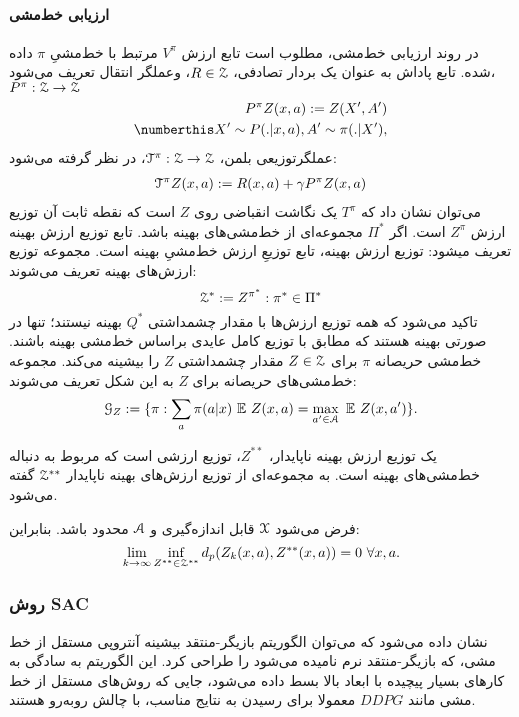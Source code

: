 \paragraph{ارزیابی خط‌مشی}
در روند ارزیابی خط‌مشی، مطلوب است تابع ارزش
$V^\pi$
مرتبط با خط‌مشیِ $\pi$ داده شده. 
تابع پاداش به عنوان یک بردار تصادفی، 
$R \in \EuScript{Z}$،
وعملگر انتقال تعریف می‌شود،
$P^\pi : \EuScript{Z} \rightarrow \EuScript{Z}$
\begin{align}
P^{\pi} Z(x,a) := Z(X',A') \\ \numberthis
X' \sim P(.|x,a), A'\sim \pi (.|X'), \nonumber
\end{align}
عملگرتوزیعی بلمن،
$\EuScript{T}^\pi : \EuScript{Z} \rightarrow \EuScript{Z}$،
 در نظر گرفته می‌شود:
\begin{align}
 \EuScript{T}^\pi Z(x,a) := R(x,a)+ \gamma P^\pi Z(x,a)
\end{align}  
می‌توان نشان داد که $T^\pi$ یک نگاشت انقباضی 
روی
 $Z$
  است که نقطه ثابت آن توزیع ارزش 
$Z^\pi$
    است.
اگر 
$\Pi^*$
مجموعه‌ای از خط‌مشی‌های بهینه باشد. 
تابع توزیع ارزش بهینه تعریف میشود:
توزیع ارزش بهینه، تابع توزیعِ ارزش خط‌مشیِ بهینه است. مجموعه توزیع ارزش‌های بهینه تعریف می‌شوند:
$$\EuScript{Z}^* := {Z^{\pi^{*}} : \pi^* \in \Pi^* }$$
تاکید می‌شود که همه توزیع ارزش‌ها با مقدار چشمداشتی $Q^*$ 
بهینه نیستند؛ تنها در صورتی بهینه هستند که مطابق با توزیع کامل عایدی بر‌اساس خط‌مشی بهینه باشند.
خط‌مشی حریصانه
$\pi$
برای
$Z \in \EuScript{Z}$
مقدار چشمداشتی
$Z$
 را بیشینه می‌کند.
 مجموعه خط‌مشی‌های حریصانه برای 
 $Z$
 به این شکل تعریف می‌شوند:
 $$\EuScript{G}_Z := \lbrace \pi : \sum_{a} \pi (a|x) \ \mathbb{E} \ Z(x,a) = \max_{a' \in \EuScript{A}} \ \mathbb{E} \ Z(x,a') \rbrace.$$

یک توزیع ارزش بهینه ناپایدار،
$Z^{**}$،
توزیع ارزشی‌ است که مربوط به دنباله خط‌مشی‌های بهینه است. به مجموعه‌ای از توزیع ارزش‌های بهینه ناپایدار 
 $\EuScript{Z}^{**}$
 گفته می‌شود.

فرض می‌شود 
$\EuScript{X}$
قابل اندازه‌گیری و 
$\EuScript{A}$
محدود باشد.
بنابراین:
$$\lim_{k\to\infty} \inf_{Z^{**} \in \EuScript{Z}^{**}} d_p (Z_k (x,a), Z^{**}(x,a)) = 0  \ \forall x,a.$$

\subsubsection{ روش SAC}
نشان داده می‌شود که می‌توان الگوریتم بازیگر-منتقد بیشینه آنتروپی مستقل از خط مشی، که بازیگر-منتقد نرم
  نامیده‌ می‌شود را طراحی کرد.
این الگوریتم به سادگی به کارهای بسیار پیچیده با ابعاد بالا بسط داده می‌شود، جایی که روش‌های مستقل از خط مشی‌ مانند
 $DDPG$
  معمولا برای رسیدن به نتایج مناسب، با چالش روبه‌رو هستند.
  
